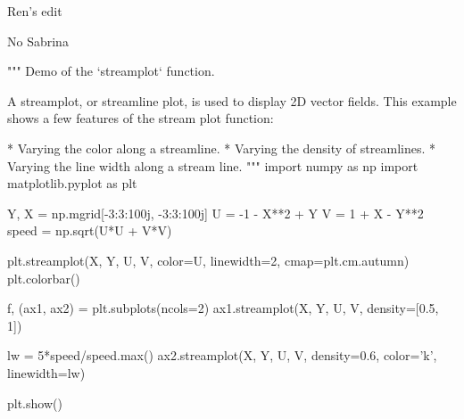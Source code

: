 Ren's edit

No Sabrina

"""
Demo of the `streamplot` function.

A streamplot, or streamline plot, is used to display 2D vector fields. This
example shows a few features of the stream plot function:

    * Varying the color along a streamline.
    * Varying the density of streamlines.
    * Varying the line width along a stream line.
"""
import numpy as np
import matplotlib.pyplot as plt

Y, X = np.mgrid[-3:3:100j, -3:3:100j]
U = -1 - X**2 + Y
V = 1 + X - Y**2
speed = np.sqrt(U*U + V*V)

plt.streamplot(X, Y, U, V, color=U, linewidth=2, cmap=plt.cm.autumn)
plt.colorbar()

f, (ax1, ax2) = plt.subplots(ncols=2)
ax1.streamplot(X, Y, U, V, density=[0.5, 1])

lw = 5*speed/speed.max()
ax2.streamplot(X, Y, U, V, density=0.6, color='k', linewidth=lw)

plt.show()

